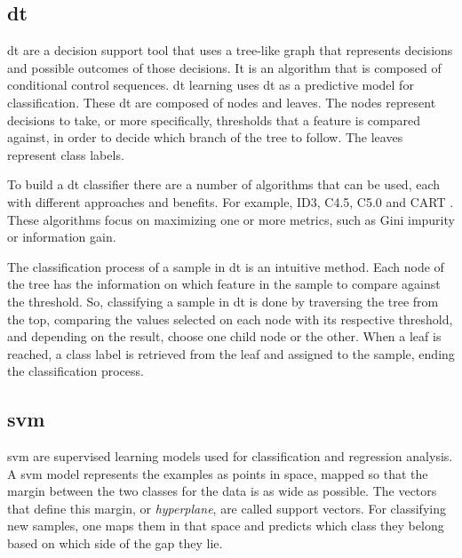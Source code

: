 \subsection{\acl{dt}}
\label{ssec:DecisionTrees}

\ac{dt} are a decision support tool that uses a tree-like graph that represents decisions and possible outcomes of those decisions. It is an algorithm that is composed of conditional control sequences. \ac{dt} learning uses \ac{dt} as a predictive model for classification.
These \ac{dt} are composed of nodes and leaves. The nodes represent decisions to take, or more specifically, thresholds that a feature is compared against, in order to decide which branch of the tree to follow. The leaves represent class labels.

To build a \ac{dt} classifier there are a number of algorithms that can be used, each with different approaches and benefits. For example, ID3, C4.5, C5.0 and CART \cite{strobl2009introduction}. These algorithms focus on maximizing one or more metrics, such as Gini impurity or information gain.

The classification process of a sample in \ac{dt} is an intuitive method. Each node of the tree has the information on which feature in the sample to compare against the threshold. So, classifying a sample in \ac{dt} is done by traversing the tree from the top, comparing the values selected on each node with its respective threshold, and depending on the result, choose one child node or the other. When a leaf is reached, a class label is retrieved from the leaf and assigned to the sample, ending the classification process.


\subsection{\acl{svm}}
\label{ssec:SuportVectorMachines}

\ac{svm} are supervised learning models used for classification and regression analysis. A \ac{svm} model represents the examples as points in space, mapped so that the margin between the two classes for the data is as wide as possible. The vectors that define this margin, or \textit{hyperplane}, are called support vectors. For classifying new samples, one maps them in that space and predicts which class they belong based on which side of the gap they lie.


